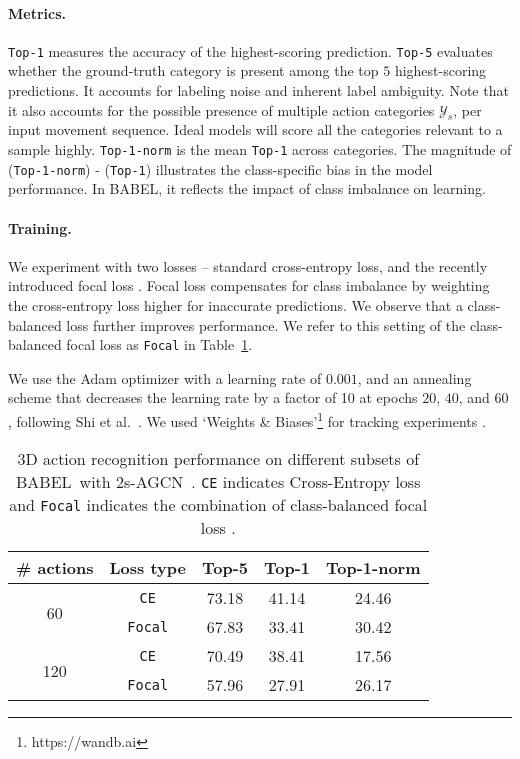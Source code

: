 \documentclass[final]{cvpr}
\def\babel{BABEL}
\def\twoSAGCN{2s-AGCN}
\begin{document}
\noindent
\paragraph{Metrics.} 
\texttt{Top-1} measures the accuracy of the highest-scoring prediction. 
\texttt{Top-5} evaluates whether the ground-truth category is present among the top $5$ highest-scoring predictions. It accounts for labeling noise and inherent label ambiguity. 
Note that it also accounts for the possible presence of multiple action categories $\mathcal{Y}_s$, per input movement sequence. 
Ideal models will score all the categories relevant to a sample highly. 
\texttt{Top-1-norm} is the mean \texttt{Top-1} across categories. The magnitude of (\texttt{Top-1-norm}) - (\texttt{Top-1}) illustrates the class-specific bias in the model performance. In \babel, it reflects the impact of class imbalance on learning. 


\noindent
\paragraph{Training.} We experiment with two losses -- standard cross-entropy loss, and the recently introduced focal loss \cite{DBLP:journals/pami/LinGGHD20}. 
Focal loss compensates for class imbalance by weighting the cross-entropy loss higher for inaccurate predictions. 
We observe that a class-balanced loss \cite{cui2019class} further improves performance. We refer to this setting of the class-balanced focal loss as \texttt{Focal} in Table~\ref{tab:act_recog}. 

We use the Adam optimizer \cite{KingmaB14} with a learning rate of $0.001$, and an annealing scheme that decreases the learning rate by a factor of 10 at epochs $20$, $40$, and $60$, following Shi et al.~\cite{shi2019two}. We used `Weights \& Biases'\footnote{https://wandb.ai} for tracking experiments \cite{wandb}. 

\begin{table}[t!]
    \centering
    \begin{tabular}{c|c|c|c|c}
        \hline
         \# actions & Loss type & Top-5 & Top-1 & Top-1-norm \\
        \hline
        \multirow{2}{1em}{60} &  \texttt{CE} & 73.18 & 41.14 & 24.46 \\
         &  \texttt{Focal} & 67.83 & 33.41 & 30.42 \\        
        \hline         
        \multirow{2}{1em}{120} &  \texttt{CE} & 70.49 & 38.41	& 17.56 \\
         &  \texttt{Focal} & 57.96 & 27.91	& 26.17 \\        
        \hline
    \end{tabular}
    \vspace{5pt}
    \caption{
        3D action recognition performance on different subsets of \babel~with \twoSAGCN~\cite{shi2019two}. 
        \texttt{CE} indicates Cross-Entropy loss and \texttt{Focal} indicates the combination of class-balanced \cite{cui2019class} focal loss \cite{DBLP:journals/pami/LinGGHD20}. 
    }
    \label{tab:act_recog}
\end{table}
\end{document}
